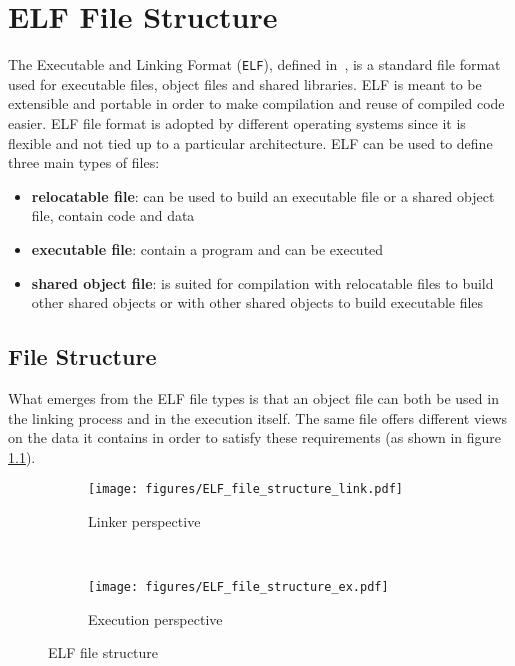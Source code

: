 \chapter{ELF File Structure}

The Executable and Linking Format (\texttt{ELF}), defined in~\cite{ELF:1995}, is a standard file format used for executable files, object files and shared libraries. ELF is meant to be extensible and portable in order to make compilation and reuse of compiled code easier. ELF file format is adopted by different operating systems since it is flexible and not tied up to a particular architecture. ELF can be used to define three main types of files:
\begin{itemize}
	\item \textbf{relocatable file}: can be used to build an executable file or a shared object file, contain code and data
	\item \textbf{executable file}: contain a program and can be executed
	\item \textbf{shared object file}: is suited for compilation with relocatable files to build other shared objects or with other shared objects to build executable files
\end{itemize}

\section{File Structure}

What emerges from the ELF file types is that an object file can both be used in the linking process and in the execution itself. The same file offers different views on the data it contains in order to satisfy these requirements (as shown in figure \ref{fig:ELF file structure}).

	\begin{figure}[!ht]
        \centering
        \begin{subfigure}[b]{0.35\textwidth}
        \centering
        \texttt{[image: figures/ELF\_file\_structure\_link.pdf]}
		\caption{Linker perspective}
        \end{subfigure}%
		~\hspace{2cm}
        \begin{subfigure}[b]{0.35\textwidth}
        \centering
        \texttt{[image: figures/ELF\_file\_structure\_ex.pdf]}
		\caption{Execution perspective}
		
        \end{subfigure}%
		\caption{ELF file structure}
		\label{fig:ELF file structure}		
	\end{figure}

